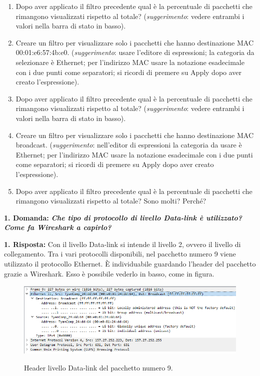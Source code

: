 \documentclass[a4paper]{article}
\begin{document}
\begin{enumerate}
		\item Dopo aver applicato il filtro precedente qual è la percentuale di pacchetti che rimangono visualizzati rispetto al totale?\newline
		(\emph{suggerimento}: vedere entrambi i valori nella barra di stato in basso).
		
		\item Creare un filtro per visualizzare solo i pacchetti che hanno destinazione MAC 00:01:e6:57:4b:e0.\newline
		(\emph{suggerimento}: usare l'editore di espressioni; la categoria da selezionare è \textsf{Ethernet}; per l'indirizzo MAC usare la notazione esadecimale con i due punti come separatori; si ricordi di premere su \textsf{Apply} dopo aver creato l'espressione).
		
		\item Dopo aver applicato il filtro precedente qual è la percentuale di pacchetti che rimangono visualizzati rispetto al totale?\newline
		(\emph{suggerimento}: vedere entrambi i valori nella barra di stato in basso).
		
		\item Creare un filtro per visualizzare solo i pacchetti che hanno destinazione MAC broadcast.\newline
		(\emph{suggerimento}: nell'editor di espressioni la categoria da usare è \textsf{Ethernet}; per l'indirizzo MAC usare la notazione esadecimale con i due punti come separatori; si ricordi di premere su \textsf{Apply} dopo aver creato l'espressione).
		
		\item Dopo aver applicato il filtro precedente qual è la percentuale di pacchetti che rimangono visualizzati rispetto al totale? Sono molti? Perché?
	\end{enumerate}\newpage
	
	\noindent
	\textcolor{Red3}{\textbf{1. Domanda:}} \textbf{\emph{Che tipo di protocollo di livello Data-link è utilizzato? Come fa Wireshark a capirlo?}}\newline
	
	\noindent
	\textcolor{Green4}{\textbf{1. Risposta:}} Con il livello Data-link si intende il livello 2, ovvero il livello di collegamento. Tra i vari protocolli disponibili, nel pacchetto numero 9 viene utilizzato il protocollo Ethernet. È individuabile guardando l'header del pacchetto grazie a Wireshark. Esso è possibile vederlo in basso, come in figura.
	\begin{figure}[!htp]
		\centering
		\includegraphics[width=\textwidth]{img/wireshark/ex1.png}
		\label{fig:header-ex1}
		\caption{Header livello Data-link del pacchetto numero 9.}
	\end{figure}
	
\end{document}
